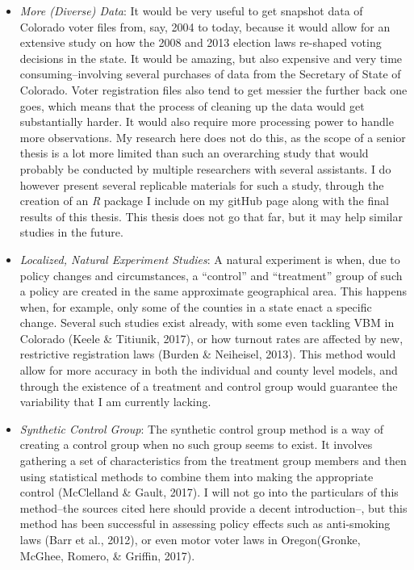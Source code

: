 \documentclass[12pt,twoside]{reedthesis}
\begin{document}
  \begin{itemize}
  \item
    \emph{More (Diverse) Data}: It would be very useful to get snapshot
    data of Colorado voter files from, say, 2004 to today, because it
    would allow for an extensive study on how the 2008 and 2013 election
    laws re-shaped voting decisions in the state. It would be amazing, but
    also expensive and very time consuming--involving several purchases of
    data from the Secretary of State of Colorado. Voter registration files
    also tend to get messier the further back one goes, which means that
    the process of cleaning up the data would get substantially harder. It
    would also require more processing power to handle more observations.
    My research here does not do this, as the scope of a senior thesis is
    a lot more limited than such an overarching study that would probably
    be conducted by multiple researchers with several assistants. I do
    however present several replicable materials for such a study, through
    the creation of an \textit{R} package I include on my gitHub page
    along with the final results of this thesis. This thesis does not go
    that far, but it may help similar studies in the future.
  \item
    \emph{Localized, Natural Experiment Studies}: A natural experiment is
    when, due to policy changes and circumstances, a ``control'' and
    ``treatment'' group of such a policy are created in the same
    approximate geographical area. This happens when, for example, only
    some of the counties in a state enact a specific change. Several such
    studies exist already, with some even tackling VBM in Colorado (Keele
    \& Titiunik, 2017), or how turnout rates are affected by new,
    restrictive registration laws (Burden \& Neiheisel, 2013). This method
    would allow for more accuracy in both the individual and county level
    models, and through the existence of a treatment and control group
    would guarantee the variability that I am currently lacking.
  \item
    \emph{Synthetic Control Group}: The synthetic control group method is
    a way of creating a control group when no such group seems to exist.
    It involves gathering a set of characteristics from the treatment
    group members and then using statistical methods to combine them into
    making the appropriate control (McClelland \& Gault, 2017). I will not
    go into the particulars of this method--the sources cited here should
    provide a decent introduction--, but this method has been successful
    in assessing policy effects such as anti-smoking laws (Barr et al.,
    2012), or even motor voter laws in Oregon(Gronke, McGhee, Romero, \&
    Griffin, 2017).
  \end{itemize}
  
\end{document}

